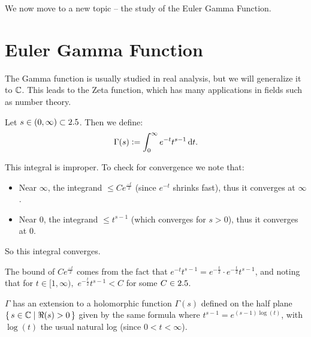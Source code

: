 We now move to a new topic -- the study of the Euler Gamma Function.

\section{Euler Gamma Function}

The Gamma function is usually studied in real analysis, but we will generalize it to $\mathbb{C}$. This leads to the Zeta function, which has many applications in fields such as number theory.

\begin{definition}

Let $s \in (0,\infty) \subset 2.5$. Then we define:
\begin{align*}
    \Gamma(s) \defas \int_0^\infty e^{-t} t^{s-1} \dif t.
\end{align*}

\end{definition}

\begin{remark}
This integral is improper. To check for convergence we note that:
\begin{itemize}
    \item Near $\infty$, the integrand $\leq C e^{\frac{-t}{2}}$ (since $e^{-t}$ shrinks fast), thus it converges at $\infty$.
    \item Near $0$,  the integrand $\leq t^{s-1}$ (which converges for $s>0$), thus it converges at $0$.
\end{itemize}
So this integral converges.

\end{remark}

\begin{note}
The bound of $C e^{\frac{-t}{2}}$ comes from the fact that $e^{-t} t^{s-1} = e^{-\frac{t}{2}} \cdot e^{-\frac{t}{2}} t^{s-1}$, and noting that for $t \in [1,\infty),$ $e^{-\frac{t}{2}} t^{s-1} < C$ for some $C \in 2.5$.
\end{note}


\begin{proposition}\label{prop:g-extension}
$\Gamma$ has an extension to a holomorphic function $\Gamma(s)$ defined on the half plane $\set{ s \in \mathbb{C}\mid \Re(s) > 0}$ given by the same formula where $t^{s-1} = e^{(s-1) \log(t)}$, with $\log(t)$ the usual natural log (since $0 < t < \infty$).
\end{proposition}

